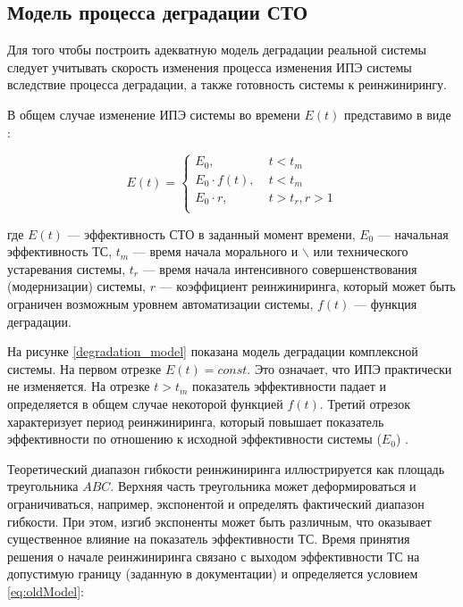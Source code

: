 \subsection{Модель процесса деградации СТО}
Для того чтобы построить адекватную модель деградации реальной системы следует учитывать скорость изменения процесса изменения ИПЭ системы вследствие процесса деградации, а также готовность системы к реинжинирингу. 

В общем случае изменение ИПЭ системы во времени $E(t)$ представимо в виде \cite{Doronina}:

\begin{equation} \label{eq:oldModel}
    E(t) = \begin{cases}
        E_0,            & \; t<t_m         \\
        E_0 \cdot f(t), & \; t<t_m         \\
        E_0 \cdot r,          & \; t>t_r, r>1 \\
    \end{cases}
\end{equation}

\noindent
где $E(t)$ --- эффективность СТО в заданный момент времени,
$E_0$ --- начальная эффективность ТС, 
$t_m$ --- время начала морального и $\backslash$ или технического устаревания системы,
$t_r$ --- время начала интенсивного совершенствования (модернизации) системы,
$r$ --- коэффициент реинжиниринга, который может быть ограничен возможным уровнем автоматизации системы,
$f(t)$ --- функция деградации.

На рисунке \ref{degradation_model} показана модель деградации комплексной системы. 
На первом отрезке $E(t) = const$. 
Это означает, что ИПЭ практически не изменяется. 
На отрезке $t > t_m$ показатель эффективности падает и определяется в общем случае некоторой функцией $f(t)$. 
Третий отрезок характеризует период реинжиниринга, который повышает показатель эффективности по отношению к исходной эффективности системы ($E_0$) \cite{Doronina}.


Теоретический диапазон гибкости реинжиниринга иллюстрируется как площадь треугольника $ABC$. 
Верхняя часть треугольника может деформироваться и ограничиваться, например, экспонентой и определять фактический диапазон гибкости. 
При этом, изгиб экспоненты может быть различным, что оказывает существенное влияние на показатель эффективности ТС. 
Время принятия решения о начале реинжиниринга связано с выходом эффективности ТС на допустимую границу (заданную в документации) и определяется условием \ref{eq:oldModel}:

